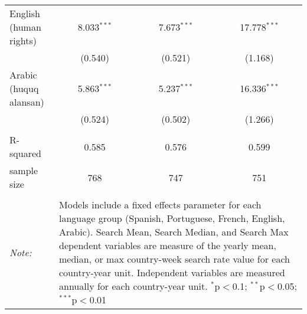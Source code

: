 \begin{table}[!htbp]
\begin{tabular}{@{\extracolsep{5pt}}lccc}
  English (human rights) & 8.033$^{***}$ & 7.673$^{***}$ & 17.778$^{***}$ \\ 
  & (0.540) & (0.521) & (1.168) \\ 
  Arabic (huquq alansan) & 5.863$^{***}$ & 5.237$^{***}$ & 16.336$^{***}$ \\ 
  & (0.524) & (0.502) & (1.266) \\ 
 \hline \\[-1.8ex] 
R-squared  & 0.585 & 0.576 & 0.599 \\ 
sample size  & 768 & 747 & 751 \\ 
\hline 
\hline \\[-1.8ex] 
\textit{Note:}  & \multicolumn{3}{l}{\parbox[t]{8cm}{Models include a fixed effects parameter for each language group (Spanish, Portuguese, French, English, Arabic). Search Mean, Search Median, and Search Max dependent variables are measure of the yearly mean, median, or max country-week search rate value for each country-year unit. Independent variables are measured annually for each country-year unit. $^{*}$p$<$0.1; $^{**}$p$<$0.05; $^{***}$p$<$0.01}} \\ 
\end{tabular} 
\end{table} 
